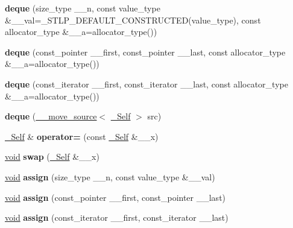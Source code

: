 \begin{DoxyCompactItemize}
{\bfseries deque} (size\+\_\+type \+\_\+\+\_\+n, const value\+\_\+type \&\+\_\+\+\_\+val=\+\_\+\+S\+T\+L\+P\+\_\+\+D\+E\+F\+A\+U\+L\+T\+\_\+\+C\+O\+N\+S\+T\+R\+U\+C\+T\+ED(value\+\_\+type), const allocator\+\_\+type \&\+\_\+\+\_\+a=allocator\+\_\+type())
\item 
\mbox{\label{classdeque_a69c8a718d31e75363bf116e3e71f44e8}} 
{\bfseries deque} (const\+\_\+pointer \+\_\+\+\_\+first, const\+\_\+pointer \+\_\+\+\_\+last, const allocator\+\_\+type \&\+\_\+\+\_\+a=allocator\+\_\+type())
\item 
\mbox{\label{classdeque_a39fddb3c21bd676926040d9496fda161}} 
{\bfseries deque} (const\+\_\+iterator \+\_\+\+\_\+first, const\+\_\+iterator \+\_\+\+\_\+last, const allocator\+\_\+type \&\+\_\+\+\_\+a=allocator\+\_\+type())
\item 
\mbox{\label{classdeque_a8047e4723c11c7098194f7d62353ad13}} 
{\bfseries deque} (\hyperlink{class____move__source}{\+\_\+\+\_\+move\+\_\+source}$<$ \hyperlink{classdeque}{\+\_\+\+Self} $>$ src)
\item 
\mbox{\label{classdeque_a356d6145750aa80835244c8683878619}} 
\hyperlink{classdeque}{\+\_\+\+Self} \& {\bfseries operator=} (const \hyperlink{classdeque}{\+\_\+\+Self} \&\+\_\+\+\_\+x)
\item 
\mbox{\label{classdeque_a33bb324e2a525a085c3a1df23990b184}} 
\hyperlink{interfacevoid}{void} {\bfseries swap} (\hyperlink{classdeque}{\+\_\+\+Self} \&\+\_\+\+\_\+x)
\item 
\mbox{\label{classdeque_a0b4fe50f10526f395390705ebe5eebc4}} 
\hyperlink{interfacevoid}{void} {\bfseries assign} (size\+\_\+type \+\_\+\+\_\+n, const value\+\_\+type \&\+\_\+\+\_\+val)
\item 
\mbox{\label{classdeque_a8d9ad6d448f4db90075b3baabb9696af}} 
\hyperlink{interfacevoid}{void} {\bfseries assign} (const\+\_\+pointer \+\_\+\+\_\+first, const\+\_\+pointer \+\_\+\+\_\+last)
\item 
\mbox{\label{classdeque_ad31750de5d83743071b0ba68881f6e26}} 
\hyperlink{interfacevoid}{void} {\bfseries assign} (const\+\_\+iterator \+\_\+\+\_\+first, const\+\_\+iterator \+\_\+\+\_\+last)

\end{DoxyCompactItemize}

